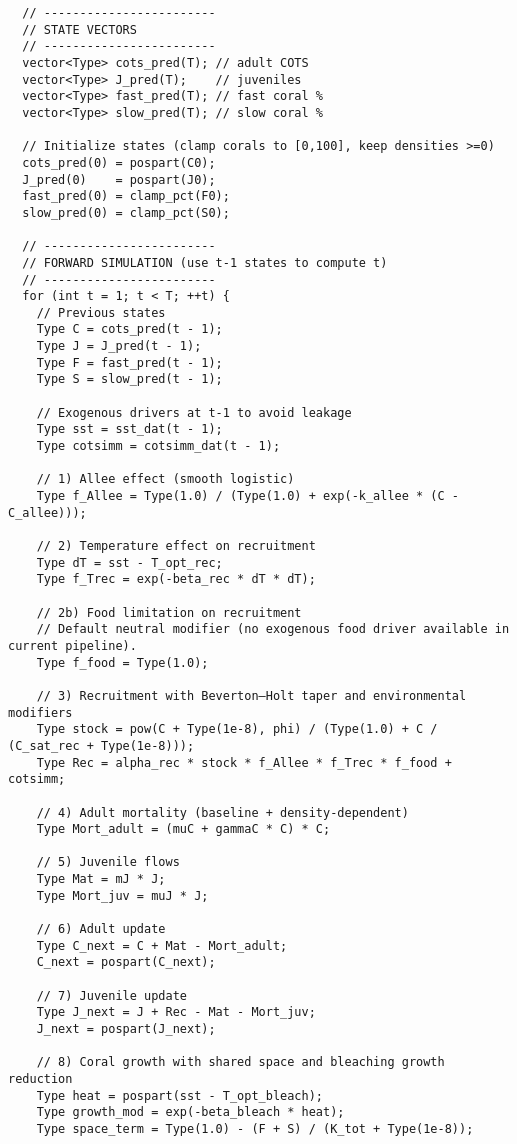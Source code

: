 \begin{lstlisting}
  // ------------------------
  // STATE VECTORS
  // ------------------------
  vector<Type> cots_pred(T); // adult COTS
  vector<Type> J_pred(T);    // juveniles
  vector<Type> fast_pred(T); // fast coral %
  vector<Type> slow_pred(T); // slow coral %

  // Initialize states (clamp corals to [0,100], keep densities >=0)
  cots_pred(0) = pospart(C0);
  J_pred(0)    = pospart(J0);
  fast_pred(0) = clamp_pct(F0);
  slow_pred(0) = clamp_pct(S0);

  // ------------------------
  // FORWARD SIMULATION (use t-1 states to compute t)
  // ------------------------
  for (int t = 1; t < T; ++t) {
    // Previous states
    Type C = cots_pred(t - 1);
    Type J = J_pred(t - 1);
    Type F = fast_pred(t - 1);
    Type S = slow_pred(t - 1);

    // Exogenous drivers at t-1 to avoid leakage
    Type sst = sst_dat(t - 1);
    Type cotsimm = cotsimm_dat(t - 1);

    // 1) Allee effect (smooth logistic)
    Type f_Allee = Type(1.0) / (Type(1.0) + exp(-k_allee * (C - C_allee)));

    // 2) Temperature effect on recruitment
    Type dT = sst - T_opt_rec;
    Type f_Trec = exp(-beta_rec * dT * dT);

    // 2b) Food limitation on recruitment
    // Default neutral modifier (no exogenous food driver available in current pipeline).
    Type f_food = Type(1.0);

    // 3) Recruitment with Beverton–Holt taper and environmental modifiers
    Type stock = pow(C + Type(1e-8), phi) / (Type(1.0) + C / (C_sat_rec + Type(1e-8)));
    Type Rec = alpha_rec * stock * f_Allee * f_Trec * f_food + cotsimm;

    // 4) Adult mortality (baseline + density-dependent)
    Type Mort_adult = (muC + gammaC * C) * C;

    // 5) Juvenile flows
    Type Mat = mJ * J;
    Type Mort_juv = muJ * J;

    // 6) Adult update
    Type C_next = C + Mat - Mort_adult;
    C_next = pospart(C_next);

    // 7) Juvenile update
    Type J_next = J + Rec - Mat - Mort_juv;
    J_next = pospart(J_next);

    // 8) Coral growth with shared space and bleaching growth reduction
    Type heat = pospart(sst - T_opt_bleach);
    Type growth_mod = exp(-beta_bleach * heat);
    Type space_term = Type(1.0) - (F + S) / (K_tot + Type(1e-8));


\end{lstlisting}
